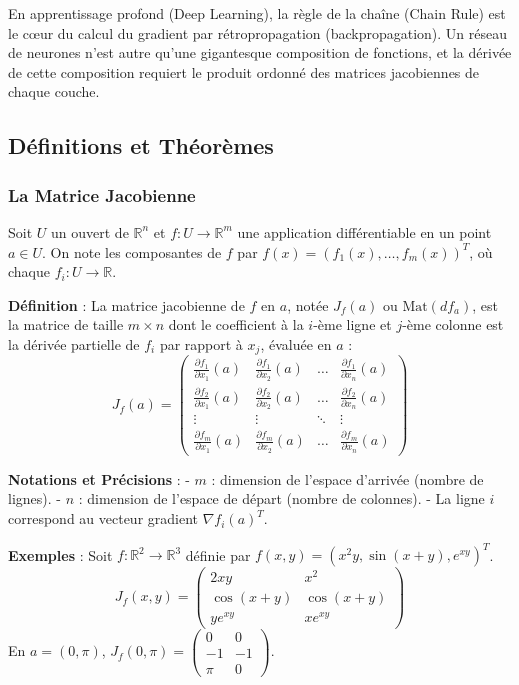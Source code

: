 \documentclass[11pt,a4paper]{article}
\begin{document}
En apprentissage profond (Deep Learning), la règle de la chaîne (Chain Rule) est le cœur du calcul du gradient par rétropropagation (backpropagation). Un réseau de neurones n'est autre qu'une gigantesque composition de fonctions, et la dérivée de cette composition requiert le produit ordonné des matrices jacobiennes de chaque couche.

\subsection{Définitions et Théorèmes}

\subsubsection{La Matrice Jacobienne}

Soit $U$ un ouvert de $\mathbb{R}^n$ et $f : U \to \mathbb{R}^m$ une application différentiable en un point $a \in U$.
On note les composantes de $f$ par $f(x) = (f_1(x), \dots, f_m(x))^T$, où chaque $f_i : U \to \mathbb{R}$.

\textbf{Définition} : La matrice jacobienne de $f$ en $a$, notée $J_f(a)$ ou $\mathrm{Mat}(df_a)$, est la matrice de taille $m \times n$ dont le coefficient à la $i$-ème ligne et $j$-ème colonne est la dérivée partielle de $f_i$ par rapport à $x_j$, évaluée en $a$ :
$$
J_f(a) = \begin{pmatrix}
\frac{\partial f_1}{\partial x_1}(a) & \frac{\partial f_1}{\partial x_2}(a) & \dots & \frac{\partial f_1}{\partial x_n}(a) \\
\frac{\partial f_2}{\partial x_1}(a) & \frac{\partial f_2}{\partial x_2}(a) & \dots & \frac{\partial f_2}{\partial x_n}(a) \\
\vdots & \vdots & \ddots & \vdots \\
\frac{\partial f_m}{\partial x_1}(a) & \frac{\partial f_m}{\partial x_2}(a) & \dots & \frac{\partial f_m}{\partial x_n}(a)
\end{pmatrix}
$$

\textbf{Notations et Précisions} :
- \textbf{$m$} : dimension de l'espace d'arrivée (nombre de lignes).
- \textbf{$n$} : dimension de l'espace de départ (nombre de colonnes).
- La ligne $i$ correspond au vecteur gradient $\nabla f_i(a)^T$.

\textbf{Exemples} :
Soit $f: \mathbb{R}^2 \to \mathbb{R}^3$ définie par $f(x,y) = (x^2y, \sin(x+y), e^{xy})^T$.
$$
J_f(x,y) = \begin{pmatrix}
2xy & x^2 \\
\cos(x+y) & \cos(x+y) \\
y e^{xy} & x e^{xy}
\end{pmatrix}
$$
En $a = (0, \pi)$, $J_f(0, \pi) = \begin{pmatrix} 0 & 0 \\ -1 & -1 \\ \pi & 0 \end{pmatrix}$.
\end{document}
